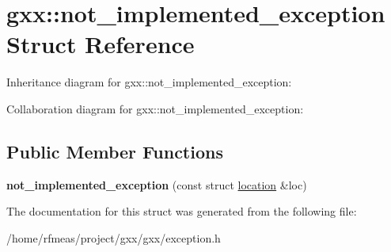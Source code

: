 \hypertarget{structgxx_1_1not__implemented__exception}{}\section{gxx\+:\+:not\+\_\+implemented\+\_\+exception Struct Reference}
\label{structgxx_1_1not__implemented__exception}


Inheritance diagram for gxx\+:\+:not\+\_\+implemented\+\_\+exception\+:


Collaboration diagram for gxx\+:\+:not\+\_\+implemented\+\_\+exception\+:
\subsection*{Public Member Functions}
\begin{DoxyCompactItemize}
\item 
{\bfseries not\+\_\+implemented\+\_\+exception} (const struct \hyperlink{structlocation}{location} \&loc)\hypertarget{structgxx_1_1not__implemented__exception_aaaa89ffb1772f9088b5fcf73048b13f3}{}\label{structgxx_1_1not__implemented__exception_aaaa89ffb1772f9088b5fcf73048b13f3}

\end{DoxyCompactItemize}


The documentation for this struct was generated from the following file\+:\begin{DoxyCompactItemize}
\item 
/home/rfmeas/project/gxx/gxx/exception.\+h\end{DoxyCompactItemize}
